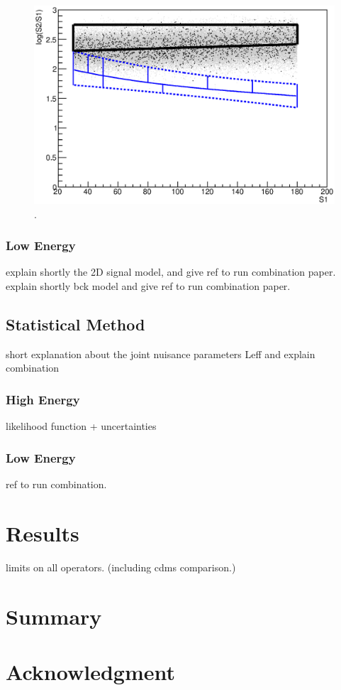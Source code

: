\documentclass[twocolumn, showpacs, showkeys, amsmath, amssymb, floatfix]{revtex4}
\begin{document}
\begin{figure}[h!]
\begin{minipage}{1.\linewidth}
\centerline{\includegraphics[width=1.\linewidth]{Figures/phasespace.eps}}
\end{minipage}
\caption{.}
\label{fig:Acc}
\end{figure}  


\subsubsection{Low Energy}
explain shortly the 2D signal model, and give ref to run combination paper.
explain shortly bck model and give ref to run combination paper. 
\subsection{Statistical Method}
short explanation about the joint nuisance parameters {Leff} and explain combination
\subsubsection{High Energy}
likelihood function + uncertainties 
\subsubsection{Low Energy}
ref to run combination.
\section{Results}

limits on all operators. (including cdms comparison.)

\section{Summary}
\section{Acknowledgment}





\end{document}
